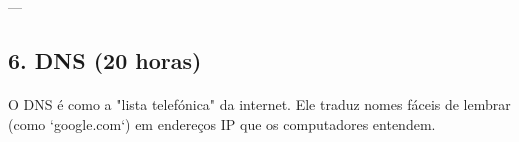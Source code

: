 \documentclass[10pt,a4paper]{article}
\begin{document}
	---
	
	\subsection*{6. DNS (20 horas)}
	\vspace{-1.2em}
	\paragraph{}
	O DNS é como a "lista telefónica" da internet. Ele traduz nomes fáceis de lembrar (como `google.com`) em endereços IP que os computadores entendem.
	
\end{document}
